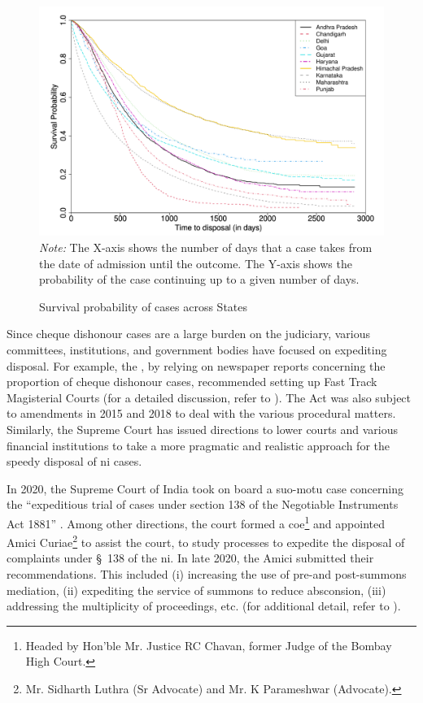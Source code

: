 \documentclass[12pt,a4paper]{article}
\begin{document}
\begin{figure}[!ht]
\centering
\caption{Survival probability of cases across States}\label{fig:stateSurvival}
\footnotesize
\includegraphics[width=\textwidth]{surv_states-1.png}
\textit{Note:} The X-axis shows the number of days that a case takes from the date of admission until the outcome. The Y-axis shows the probability of the case continuing up to a given number of days.
\end{figure}

Since cheque dishonour cases are a large burden on the judiciary, various committees, institutions, and government bodies have focused on expediting disposal. For example, the \textcite{lci2008_138}, by relying on newspaper reports concerning the proportion of cheque dishonour cases, recommended setting up Fast Track Magisterial Courts (for a detailed discussion, refer to \textcite{bhan2015_placing}). The Act was also subject to amendments in 2015 and 2018 to deal with the various procedural matters. Similarly, the Supreme Court has issued directions to lower courts and various financial institutions to take a more pragmatic and realistic approach for the speedy disposal of \gls{ni} cases.

In 2020, the Supreme Court of India took on board a suo-motu case concerning the “expeditious trial of cases under section 138 of the Negotiable Instruments Act 1881” \autocite{sc2020_138}. Among other directions, the court formed a \gls{coe}\footnote{Headed by Hon’ble Mr. Justice RC Chavan, former Judge of the Bombay High Court.} and appointed Amici Curiae\footnote{Mr. Sidharth Luthra (Sr Advocate) and Mr. K Parameshwar (Advocate).} to assist the court, to study processes to expedite the disposal of complaints under \S~138 of the \gls{ni}. In late 2020, the Amici submitted their recommendations. This included (i) increasing the use of pre-and post-summons mediation, (ii) expediting the service of summons to reduce absconsion, (iii) addressing the multiplicity of proceedings, etc. (for additional detail, refer to \autocite{amicus2020_submission}).
\end{document}
